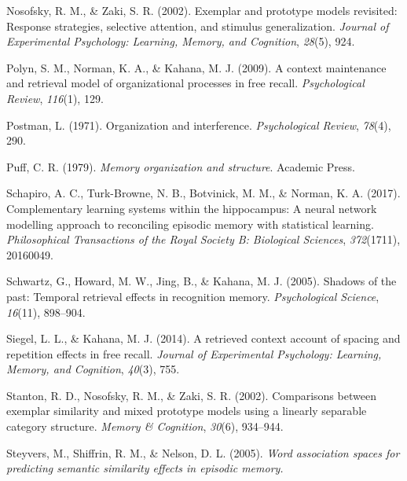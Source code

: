 \documentclass[
  letterpaper,
  DIV=11]{article}
\newlength{\cslhangindent}
\newlength{\cslentryspacingunit} %
\newenvironment{CSLReferences}[2] %
 {%
  \setlength{\parindent}{0pt}
  \ifodd #1
  \let\oldpar\par
  \def\par{\hangindent=\cslhangindent\oldpar}
  \fi
  \setlength{\parskip}{#2\cslentryspacingunit}
 }%
 {}
\begin{document}
\begin{CSLReferences}{1}{0}
\leavevmode{}%
Nosofsky, R. M., \& Zaki, S. R. (2002). Exemplar and prototype models
revisited: Response strategies, selective attention, and stimulus
generalization. \emph{Journal of Experimental Psychology: Learning,
Memory, and Cognition}, \emph{28}(5), 924.

\leavevmode{}%
Polyn, S. M., Norman, K. A., \& Kahana, M. J. (2009). A context
maintenance and retrieval model of organizational processes in free
recall. \emph{Psychological Review}, \emph{116}(1), 129.

\leavevmode{}%
Postman, L. (1971). Organization and interference. \emph{Psychological
Review}, \emph{78}(4), 290.

\leavevmode{}%
Puff, C. R. (1979). \emph{Memory organization and structure}. Academic
Press.

\leavevmode{}%
Schapiro, A. C., Turk-Browne, N. B., Botvinick, M. M., \& Norman, K. A.
(2017). Complementary learning systems within the hippocampus: A neural
network modelling approach to reconciling episodic memory with
statistical learning. \emph{Philosophical Transactions of the Royal
Society B: Biological Sciences}, \emph{372}(1711), 20160049.

\leavevmode{}%
Schwartz, G., Howard, M. W., Jing, B., \& Kahana, M. J. (2005). Shadows
of the past: Temporal retrieval effects in recognition memory.
\emph{Psychological Science}, \emph{16}(11), 898--904.

\leavevmode{}%
Siegel, L. L., \& Kahana, M. J. (2014). A retrieved context account of
spacing and repetition effects in free recall. \emph{Journal of
Experimental Psychology: Learning, Memory, and Cognition}, \emph{40}(3),
755.

\leavevmode{}%
Stanton, R. D., Nosofsky, R. M., \& Zaki, S. R. (2002). Comparisons
between exemplar similarity and mixed prototype models using a linearly
separable category structure. \emph{Memory \& Cognition}, \emph{30}(6),
934--944.

\leavevmode{}%
Steyvers, M., Shiffrin, R. M., \& Nelson, D. L. (2005). \emph{Word
association spaces for predicting semantic similarity effects in
episodic memory.}


\end{CSLReferences}
\end{document}

